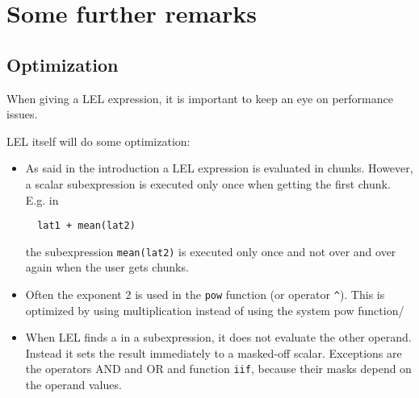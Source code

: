\section{Some further remarks}
\subsection{Optimization}
When giving a LEL expression, it is important to keep an eye
on performance issues.

LEL itself will do some optimization:
\begin{itemize}
\item As said in the introduction a LEL expression is evaluated
in chunks. However, a scalar subexpression is executed only once
when getting the first chunk.
E.g. in
  \begin{verbatim}
  lat1 + mean(lat2)
  \end{verbatim}
the subexpression \texttt{mean(lat2)} is executed only once
and not over and over again when the user gets chunks.

\item Often the exponent 2 is used in the \texttt{pow} function
(or operator \verb+^+). This is optimized by using multiplication
instead of using the system pow function/

\item When LEL finds a 
in a subexpression, it does not evaluate the other operand.
Instead it sets the result immediately to a masked-off scalar.
Exceptions are the operators AND and OR and function \texttt{iif},
because their masks depend on the operand values.
\end{itemize}

